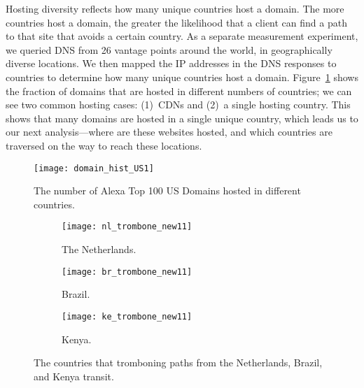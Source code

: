 \noindent Hosting diversity reflects how many unique
countries host a domain.  The more countries host a domain, the greater the
likelihood that a client can find a path to that site that avoids a certain
country. As a separate measurement experiment, we queried DNS from 26 vantage points around the world, in
geographically diverse locations. We then mapped the IP addresses in the DNS
responses to countries to determine how many unique countries host a domain.
Figure~\ref{fig:host_diversity} shows the fraction of domains that are hosted
in different numbers of countries; we can see two common hosting cases:
(1)~CDNs and (2)~a single hosting country.  This shows that many domains are
hosted in a single unique country, which leads us to our next analysis---where
are these websites hosted, and which countries are traversed on the way to
reach these locations.


\begin{figure}[t]
\centering
\texttt{[image: domain\_hist\_US1]}
\caption{The number of Alexa Top 100 US Domains hosted in different countries.}
\label{fig:host_diversity}
\end{figure}


\begin{figure*}[t!]
\begin{minipage}{\linewidth}
\begin{subfigure}[b]{.32\linewidth}
\texttt{[image: nl\_trombone\_new11]}
\caption{The Netherlands.\label{fig:trombone_netherlands}}
\end{subfigure}
\begin{subfigure}[b]{.32\linewidth}
\texttt{[image: br\_trombone\_new11]}
\caption{Brazil.\label{fig:trombone_brazil}}
\end{subfigure}
\begin{subfigure}[b]{.32\linewidth}
\texttt{[image: ke\_trombone\_new11]}
\caption{Kenya.\label{fig:trombone_kenya}}
\end{subfigure}
\end{minipage}
\caption{The countries that tromboning paths from the Netherlands, Brazil, and Kenya transit.}
\label{fig:trombone}
\end{figure*}



